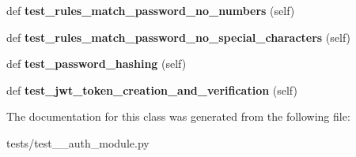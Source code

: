\begin{DoxyCompactItemize}
def {\bfseries test\+\_\+rules\+\_\+match\+\_\+password\+\_\+no\+\_\+numbers} (self)
\item 
\mbox{\label{classtests_1_1test__14__auth__module_1_1_test_user_routes_aafc511b6ab5d73d0852d8d67c108a3b8}} 
def {\bfseries test\+\_\+rules\+\_\+match\+\_\+password\+\_\+no\+\_\+special\+\_\+characters} (self)
\item 
\mbox{\label{classtests_1_1test__14__auth__module_1_1_test_user_routes_a91e7af3c0aadec426af2a48cdceeb115}} 
def {\bfseries test\+\_\+password\+\_\+hashing} (self)
\item 
\mbox{\label{classtests_1_1test__14__auth__module_1_1_test_user_routes_a2b9b963206a883411fc970d8ed79dfe3}} 
def {\bfseries test\+\_\+jwt\+\_\+token\+\_\+creation\+\_\+and\+\_\+verification} (self)
\end{DoxyCompactItemize}


The documentation for this class was generated from the following file\+:\begin{DoxyCompactItemize}
\item 
tests/test\+\_\+\_\+auth\+\_\+module.\+py\end{DoxyCompactItemize}
